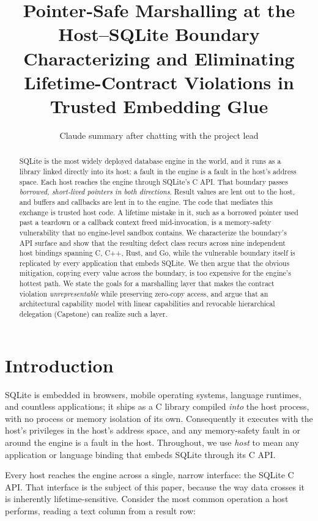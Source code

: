 \documentclass[10pt,twocolumn]{article}
\title{\vspace{-2.4em}\textbf{\large Pointer-Safe Marshalling at the Host--SQLite Boundary}\\[0.15em]
\normalsize\textnormal{Characterizing and Eliminating Lifetime-Contract Violations in Trusted Embedding Glue}}
\author{\normalsize Claude summary after chatting with the project lead}
\date{\vspace{-1.4em}}
\begin{document}
\maketitle
\thispagestyle{empty}

\begin{abstract}
\noindent SQLite is the most widely deployed database engine in the world, and
it runs as a library linked directly into its host: a fault in the engine is a
fault in the host's address space. Each host reaches the engine through
SQLite's C API. That boundary passes \emph{borrowed, short-lived pointers in
both directions}. Result values are lent out to the host, and buffers and
callbacks are lent in to the engine. The code that mediates this exchange is
trusted host code. A lifetime mistake in it, such as a borrowed pointer used
past a teardown or a callback context freed mid-invocation, is a memory-safety
vulnerability that no engine-level sandbox contains. We characterize the
boundary's API surface and show that the resulting defect class recurs across
nine independent host bindings spanning C, C++, Rust, and Go, while the
vulnerable boundary itself is replicated by every application that embeds
SQLite. We then argue that the obvious mitigation, copying every value across
the boundary, is too expensive for the engine's hottest path. We state the
goals for a marshalling layer that makes the contract violation
\emph{unrepresentable} while preserving zero-copy access, and argue that an
architectural capability model with linear capabilities and revocable
hierarchical delegation (Capstone) can realize such a layer.
\end{abstract}

\section{Introduction}

SQLite is embedded in browsers, mobile operating systems, language runtimes,
and countless applications; it ships as a C library compiled \emph{into} the
host process, with no process or memory isolation of its own. Consequently it
executes with the host's privileges in the host's address space, and any
memory-safety fault in or around the engine is a fault in the host. Throughout,
we use \emph{host} to mean any application or language binding that embeds
SQLite through its C API.

Every host reaches the engine across a single, narrow interface: the SQLite C
API. That interface is the subject of this paper, because the way data crosses
it is inherently lifetime-sensitive. Consider the most common operation a host
performs, reading a text column from a result row:
\end{document}

